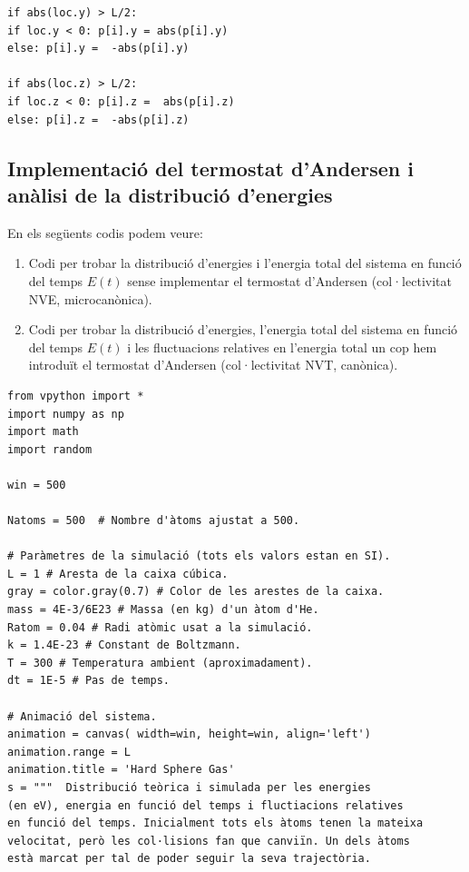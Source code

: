 \documentclass[a4paper,10.5pt]{report}
\begin{document}
\begin{appendices}
\begin{lstlisting}[caption={Simulació de la distribució de velocitats per $N = 500$ i $r_0 = 0,04$ m.}]
if abs(loc.y) > L/2:
if loc.y < 0: p[i].y = abs(p[i].y)
else: p[i].y =  -abs(p[i].y)

if abs(loc.z) > L/2:
if loc.z < 0: p[i].z =  abs(p[i].z)
else: p[i].z =  -abs(p[i].z)
	\end{lstlisting}
	
	\subsection{Implementació del termostat d'Andersen i anàlisi de la distribució d'energies}
	\label{annex:a2}
	En els següents codis podem veure:
	\begin{enumerate}
		\item Codi per trobar la distribució d'energies i l'energia total del sistema en funció del temps $E(t)$ sense implementar el termostat d'Andersen (col·lectivitat NVE, microcanònica).
		\item Codi per trobar la distribució d'energies, l'energia total del sistema en funció del temps $E(t)$ i les fluctuacions relatives en l'energia total un cop hem introduït el termostat d'Andersen (col·lectivitat NVT, canònica).
	\end{enumerate}
	
	\begin{lstlisting}[caption={Simulació de la distribució d'energies i energia total del sistema en funció del temps sense implementar el termostat d'Andersen (col·lectivitat NVE, microcanònica).}]
from vpython import *
import numpy as np
import math
import random

win = 500

Natoms = 500  # Nombre d'àtoms ajustat a 500.

# Paràmetres de la simulació (tots els valors estan en SI).
L = 1 # Aresta de la caixa cúbica.
gray = color.gray(0.7) # Color de les arestes de la caixa.
mass = 4E-3/6E23 # Massa (en kg) d'un àtom d'He.
Ratom = 0.04 # Radi atòmic usat a la simulació.
k = 1.4E-23 # Constant de Boltzmann.
T = 300 # Temperatura ambient (aproximadament).
dt = 1E-5 # Pas de temps.

# Animació del sistema.
animation = canvas( width=win, height=win, align='left')
animation.range = L
animation.title = 'Hard Sphere Gas'
s = """  Distribució teòrica i simulada per les energies
(en eV), energia en funció del temps i fluctiacions relatives 
en funció del temps. Inicialment tots els àtoms tenen la mateixa
velocitat, però les col·lisions fan que canviïn. Un dels àtoms
està marcat per tal de poder seguir la seva trajectòria.


\end{lstlisting}
\end{appendices}
\end{document}
